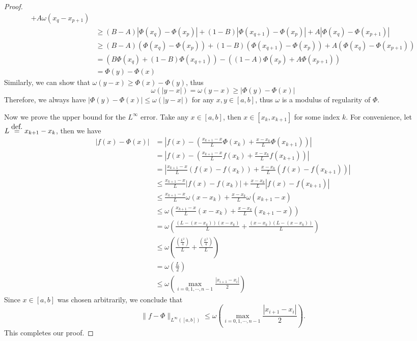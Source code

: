 \documentclass[10pt,a4paper]{amsart}
\newcommand{\eqdef}{\ensuremath{\stackrel{\mbox{\upshape\tiny def.}}{=}}}
\begin{document}
\begin{proof}
\begin{align*}
    + A \omega (x_q - x_{p+1})
    \\
    &\ge (B-A) |\Phi(x_q) - \Phi(x_p)|
    + (1-B) |\Phi(x_{q+1}) - \Phi(x_p)|
    + A |\Phi(x_q) - \Phi(x_{p+1})|
    \\
    &\ge (B-A) (\Phi(x_q) - \Phi(x_p))
    + (1-B) (\Phi(x_{q+1}) - \Phi(x_p))
    + A (\Phi(x_q) - \Phi(x_{p+1}))
    \\
    &= (B \Phi(x_q) + (1-B) \Phi(x_{q+1})) 
    - ((1-A) \Phi(x_p) + A \Phi(x_{p+1}))
    \\
    &= \Phi(y) - \Phi(x)
\end{align*}
Similarly, we can show that $\omega(y-x) \ge \Phi(x) - \Phi(y)$, thus 
$$\omega(|y-x|) = \omega(y-x) \ge |\Phi(y) - \Phi(x)|$$
Therefore, we always have $|\Phi(y) - \Phi(x)| \le \omega(|y-x|)$ for any $x,y\in[a,b]$, thus $\omega$ is a modulus of regularity of $\Phi$.

Now we prove the upper bound for the $L^{\infty}$ error. Take any $x\in[a,b]$, then $x\in[x_k,x_{k+1}]$ for some index $k$. For convenience, let $L \eqdef x_{k+1}-x_k$, then we have 
\allowdisplaybreaks
\begin{align*}
    |f(x) - \Phi(x)|
    &= 
    \left| f(x) - 
        \left(
            \frac{x_{k+1}-x}{L} \Phi(x_k)
            + \frac{x-x_k}{L} \Phi(x_{k+1})
        \right) 
    \right|
    \\
    &=\left| f(x) - \left(
        \frac{x_{k+1}-x}{L} f(x_k)
        + \frac{x-x_k}{L} f(x_{k+1})
    \right) \right|
    \\
    &=
    \left|
    \frac{x_{k+1}-x}{L} (f(x) - f(x_k))
    +
    \frac{x-x_k}{L} (f(x) - f(x_{k+1}))
    \right|
    \\
    &\le 
    \frac{x_{k+1}-x}{L} |f(x) - f(x_k)|
    +
    \frac{x-x_k}{L} |f(x) - f(x_{k+1})|
    \\
    &\le
    \frac{x_{k+1}-x}{L} \omega(x - x_k)
    +
    \frac{x-x_k}{L} \omega(x_{k+1} - x)
    \\
    &\le
    \omega \left(
        \frac{x_{k+1}-x}{L} (x - x_k)
        +
        \frac{x-x_k}{L} (x_{k+1} - x)
    \right)
    \\
    &= 
    \omega \left(
        \frac{(L-(x - x_k))(x - x_k)}{L} 
        +
        \frac{(x - x_k)(L-(x - x_k))}{L} 
    \right)
    \\
    &\le
    \omega \left(
        \frac{\left(\frac{L^2}{4}\right)}{L} 
        +
        \frac{\left(\frac{L^2}{4}\right)}{L} 
    \right)
    \\
    &=
    \omega\left( \frac{L}{2} \right)
    \\
    &\le
    \omega \left(
    \max\limits_{i=0,1,\cdots,n-1}{\frac{|x_{i+1}-x_i|}{2}}
    \right)
\end{align*}
Since $x\in[a,b]$ was chosen arbitrarily, we conclude that 
$$\| f-\Phi \|_{L^{\infty}([a,b])} \le \omega \left(
    \max\limits_{i=0,1,\cdots,n-1}{\frac{|x_{i+1}-x_i|}{2}}
\right).
$$
This completes our proof.
\end{proof}
\end{document}
